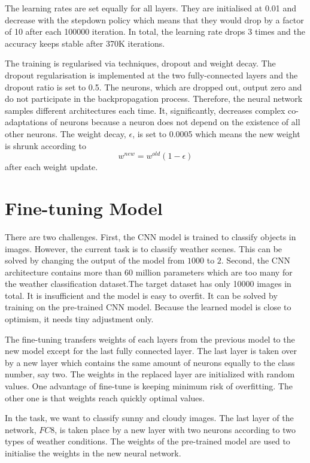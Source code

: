The learning rates are set equally for all layers. They are initialised at 0.01 and decrease with the stepdown policy which means that they would drop by a factor of 10 after each 100000 iteration. In total, the learning rate drops 3 times and the accuracy keeps stable after 370K iterations. 

The training is regularised via techniques, dropout and weight decay. The dropout regularisation is implemented at the two fully-connected layers and the dropout ratio is set to 0.5. The neurons, which are dropped out, output zero and do not participate in the backpropagation process. Therefore, the neural network samples different architectures each time. It, significantly, decreases complex co-adaptations of neurons because a neuron does not depend on the existence of all other neurons. The weight decay, $\epsilon$, is set to 0.0005 which means the new weight is shrunk according to 
\begin{equation}\label{eq:ffEq}
w^{new} = w^{old}(1 - \epsilon)
\end{equation}
after each weight update.

\section{Fine-tuning Model}

There are two challenges. First, the CNN model is trained to classify objects in images. However, the current task is to classify weather scenes. This can be solved by changing the output of the model from $1000$ to $2$. Second, the CNN architecture contains more than 60 million parameters which are too many for the weather classification dataset.The target dataset has only 10000 images in total. It is insufficient and the model is easy to overfit. It can be solved by training on the pre-trained CNN model. Because the learned model is close to optimism, it needs tiny adjustment only.

The fine-tuning transfers weights of each layers from the previous model to the new model except for the last fully connected layer. The last layer is taken over by a new layer which contains the same amount of neurons equally to the class number, say two. The weights in the replaced layer are initialized with random values. One advantage of fine-tune is keeping minimum risk of overfitting. The other one is that weights reach quickly optimal values.

In the task, we want to classify sunny and cloudy images. The last layer of the network, $FC8$, is taken place by a new layer with two neurons according to two types of weather conditions. The weights of the pre-trained model are used to initialise the weights in the new neural network. 


